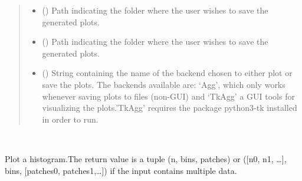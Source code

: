 \documentclass[letterpaper,10pt,english,openany, oneside]{sphinxmanual}
\begin{document}
\begin{fulllineitems}
\begin{fulllineitems}
\begin{quote}
\begin{description}
\begin{itemize}
\item {} 
 (\sphinxstyleliteralemphasis{\sphinxupquote{, }}) \textendash{} Path indicating the folder where the user wishes to save the generated plots.

\item {} 
 (\sphinxstyleliteralemphasis{\sphinxupquote{, }}) \textendash{} Path indicating the folder where the user wishes to save the generated plots.

\item {} 
 () \textendash{} String containing the name of the backend chosen to either plot or save the plots. The backends available are:
‘Agg’, which only works whenever saving plots to files (non-GUI) and ‘TkAgg’ a GUI tools for visualizing the plots.’TkAgg’ requires the package python3-tk installed in order to run.

\end{itemize}

\end{description}\end{quote}

\end{fulllineitems}


\begin{fulllineitems}
\label{\detokenize{index:fompy.plots.plotter.hist}}~

\begin{fulllineitems}
Plot a histogram.The return value is a tuple (n, bins, patches) or ({[}n0, n1, …{]},
bins, {[}patches0, patches1,…{]}) if the input contains multiple data.


\end{fulllineitems}
\end{fulllineitems}
\end{fulllineitems}
\end{document}
